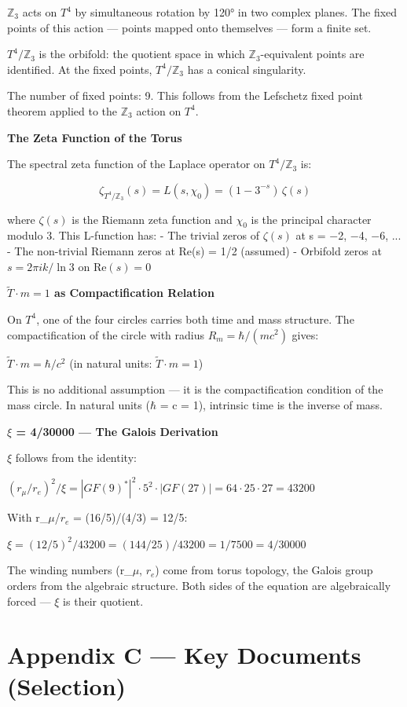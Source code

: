\documentclass[11pt,oneside]{book}
\begin{document}
$\mathbb{Z}_3$ acts on $T^4$ by simultaneous rotation by 120° in two complex planes.
The fixed points of this action — points mapped onto themselves — form a
finite set.

$T^4/\mathbb{Z}_3$ is the orbifold: the quotient space in which $\mathbb{Z}_3$-equivalent
points are identified. At the fixed points, $T^4/\mathbb{Z}_3$ has a conical
singularity.

The number of fixed points: 9. This follows from the Lefschetz fixed point
theorem applied to the $\mathbb{Z}_3$ action on $T^4$.

\textbf{The Zeta Function of the Torus}

The spectral zeta function of the Laplace operator on $T^4/\mathbb{Z}_3$ is:

\[\zeta_{T^4/\mathbb{Z}_3}(s) = L(s,\chi_0) = (1-3^{-s})\,\zeta(s)\]

where $\zeta(s)$ is the Riemann zeta function and $\chi_0$ is the principal character
modulo 3. This L-function has:
- The trivial zeros of $\zeta(s)$ at s = $-$2, $-$4, $-$6, ...
- The non-trivial Riemann zeros at Re(s) = 1/2 (assumed)
- Orbifold zeros at $s = 2\pi i k/\ln 3$ on $\mathrm{Re}(s) = 0$

\textbf{$\tilde{T}\cdot m = 1$ as Compactification Relation}

On $T^4$, one of the four circles carries both time and mass structure.
The compactification of the circle with radius $R_m = \hbar/(mc^2)$ gives:

$\tilde{T}\cdot m = \hbar/c^2$ (in natural units: $\tilde{T}\cdot m = 1$)

This is no additional assumption — it is the compactification condition of
the mass circle. In natural units ($\hbar$ = c = 1), intrinsic time is the inverse
of mass.

\textbf{$\xi$ = 4/30000 — The Galois Derivation}

$\xi$ follows from the identity:

$(r_\mu/r_e)^2/\xi = |GF(9)^*|^2 \cdot 5^2 \cdot |GF(27)| = 64\cdot 25\cdot 27 = 43200$

With r\_$\mu$/$r_e$ = (16/5)/(4/3) = 12/5:

$\xi = (12/5)^2/43200 = (144/25)/43200 = 1/7500 = 4/30000$

The winding numbers (r\_$\mu$, $r_e$) come from torus topology, the Galois
group orders from the algebraic structure. Both sides of the equation are
algebraically forced — $\xi$ is their quotient.


\chapter*{Appendix C — Key Documents (Selection)}
\end{document}
